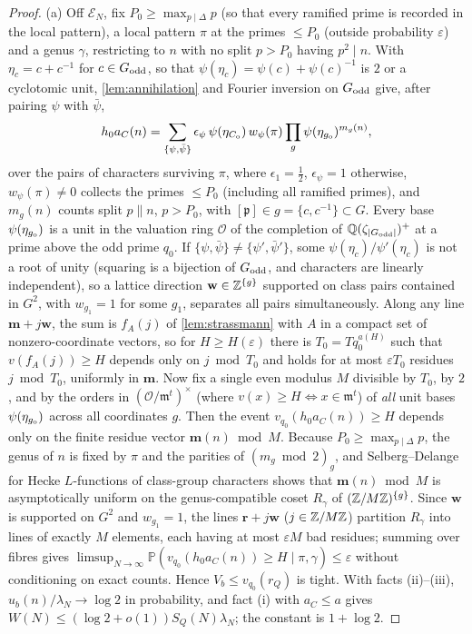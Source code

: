 \documentclass[11pt]{article}
\begin{document}
\begin{proof}
(a) Off $\mathcal E_N$, fix $P_0\ge\max_{p\mid\Delta}p$ (so that every ramified prime is recorded
in the local pattern), a local pattern $\pi$ at the primes $\le P_0$ (outside probability
$\varepsilon$) and a genus $\gamma$, restricting to $n$ with no split $p>P_0$ having $p^2\mid n$.
With $\eta_c=c+c^{-1}$ for $c\in G_{\rm odd}$, so that $\psi(\eta_c)=\psi(c)+\psi(c)^{-1}$ is
$2$ or a cyclotomic unit, \cref{lem:annihilation} and Fourier inversion on $G_{\rm odd}$ give,
after pairing $\psi$ with $\bar\psi$,
\[
h_0a_C(n)=\sum_{\{\psi,\bar\psi\}}\epsilon_\psi\,\psi(\eta_{C_{\rm o}})\,w_\psi(\pi)\prod_{g}\psi(\eta_{g_{\rm o}})^{m_g(n)},
\]
over the pairs of characters surviving $\pi$, where $\epsilon_1=\frac12$, $\epsilon_\psi=1$
otherwise, $w_\psi(\pi)\ne0$ collects the primes $\le P_0$ (including all ramified primes), and
$m_g(n)$ counts split $p\|n$, $p>P_0$, with $[\mathfrak p]\in g=\{c,c^{-1}\}\subset G$.
Every base $\psi(\eta_{g_{\rm o}})$ is a unit in the valuation ring $\mathcal O$ of the completion
of $\mathbb Q(\zeta_{|G_{\rm odd}|})^+$ at a prime above the odd prime $q_0$. If
$\{\psi,\bar\psi\}\ne\{\psi',\bar\psi'\}$, some $\psi(\eta_c)/\psi'(\eta_c)$ is not a root of
unity (squaring is a bijection of $G_{\rm odd}$, and characters are linearly independent), so a
lattice direction $\mathbf w\in\mathbb Z^{\{g\}}$ supported on class pairs contained in $G^2$, with
$w_{g_1}=1$ for some $g_1$, separates all pairs simultaneously. Along any line
$\mathbf m+j\mathbf w$, the sum is $f_A(j)$ of \cref{lem:strassmann} with $A$ in a compact set of
nonzero-coordinate vectors, so for $H\ge H(\varepsilon)$ there is $T_0=T q_0^{a(H)}$ such that
$v(f_A(j))\ge H$ depends only on $j\bmod T_0$ and holds for at most $\varepsilon T_0$ residues
$j\bmod T_0$, uniformly in $\mathbf m$. Now fix a single even modulus $M$ divisible by $T_0$, by
$2$, and by the orders in $(\mathcal O/\mathfrak m^t)^\times$ (where $v(x)\ge H\iff x\in\mathfrak m^t$)
of \emph{all} unit bases $\psi(\eta_{g_{\rm o}})$ across all coordinates $g$. Then the event
$v_{q_0}(h_0a_C(n))\ge H$ depends only on the finite residue vector $\mathbf m(n)\bmod M$. Because
$P_0\ge\max_{p\mid\Delta}p$, the genus of $n$ is fixed by $\pi$ and the parities of
$(m_g\bmod2)_g$, and Selberg--Delange for Hecke $L$-functions of class-group characters shows that
$\mathbf m(n)\bmod M$ is asymptotically uniform on the genus-compatible coset $R_\gamma$ of
$(\mathbb Z/M\mathbb Z)^{\{g\}}$. Since $\mathbf w$ is supported on $G^2$ and $w_{g_1}=1$, the lines
$\mathbf r+j\mathbf w$ ($j\in\mathbb Z/M\mathbb Z$) partition $R_\gamma$ into lines of exactly $M$ elements,
each having at most $\varepsilon M$ bad residues; summing over fibres gives
$\limsup_{N\to\infty}\mathbb P(v_{q_0}(h_0a_C(n))\ge H\mid\pi,\gamma)\le\varepsilon$ without
conditioning on exact counts. Hence $V_b\le v_{q_0}(r_Q)$ is tight. With facts (ii)--(iii),
$u_b(n)/\lambda_N\to\log2$ in probability, and fact (i) with $a_C\le a$ gives
$W(N)\le(\log2+o(1))S_Q(N)\lambda_N$; the constant is $1+\log2$.


\end{proof}
\end{document}
